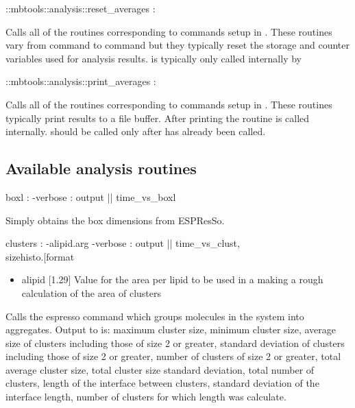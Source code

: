 \begin{code}
   ::mbtools::analysis::reset_averages  :
\end{code}
Calls all of the  routines corresponding to commands
setup in . These routines vary from command
to command but they typically reset the storage and counter variables
used for analysis results.   is typically only
called internally by 

\begin{code}
 ::mbtools::analysis::print_averages :
\end{code}
Calls all of the  routines corresponding to commands
setup in . These routines typically print
results to a file buffer. After printing the 
routine is called internally.  should be
called only after  has already been called.

\subsection{Available analysis routines}

\begin{code}
   boxl  :  -verbose  : output ||  time_vs_boxl
\end{code}
Simply obtains the box dimensions from ESPResSo.

\begin{code}
  clusters : -alipid.arg -verbose : output || time_vs_clust, \\
             sizehisto.[format %
\end{code}
\begin{itemize}
\item alipid [1.29] Value for the area per lipid to be used in a
  making a rough calculation of the area of clusters
\end{itemize}
Calls the espresso command  which groups
molecules in the system into aggregates. Output to
 is: maximum cluster size, minimum cluster
size, average size of clusters including those of size 2 or greater,
standard deviation of clusters including those of size 2 or greater,
number of clusters of size 2 or greater, total average cluster size,
total cluster size standard deviation, total number of clusters,
length of the interface between clusters, standard deviation of the
interface length, number of clusters for which length was calculate.

